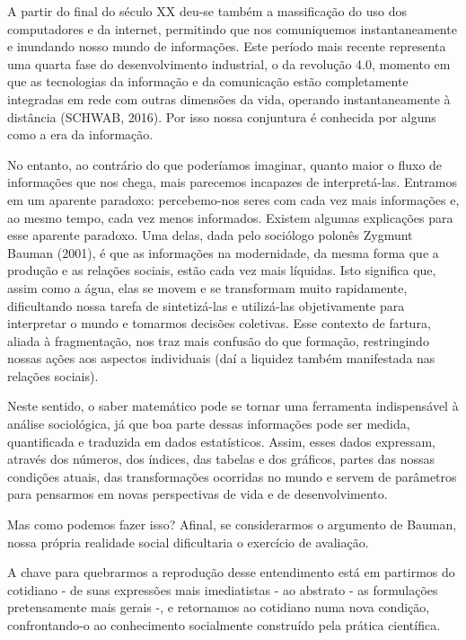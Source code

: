 A partir do final do século XX deu-se também a massificação do uso dos computadores e da internet, permitindo que nos comuniquemos instantaneamente e inundando nosso mundo de informações. Este período mais recente representa uma quarta fase do desenvolvimento industrial, o da revolução 4.0, momento em que as tecnologias da informação e da comunicação estão completamente integradas em rede com outras dimensões da vida, operando instantaneamente à distância (SCHWAB, 2016). Por isso nossa conjuntura é conhecida por alguns como a era da informação.

No entanto, ao contrário do que poderíamos imaginar, quanto maior o fluxo de informações que nos chega, mais parecemos incapazes de interpretá-las. Entramos em um aparente paradoxo: percebemo-nos seres com cada vez mais informações e, ao mesmo tempo, cada vez menos informados. Existem algumas explicações para esse aparente paradoxo. Uma delas, dada pelo sociólogo polonês Zygmunt Bauman (2001), é que as informações na modernidade, da mesma forma que a produção e as relações sociais, estão cada vez mais líquidas. Isto significa que, assim como a água, elas se movem e se transformam muito rapidamente, dificultando nossa tarefa de sintetizá-las e utilizá-las objetivamente para interpretar o mundo e tomarmos decisões coletivas. Esse contexto de fartura, aliada à fragmentação, nos traz mais confusão do que formação, restringindo nossas ações aos aspectos individuais (daí a liquidez também manifestada nas relações sociais).

Neste sentido, o saber matemático pode se tornar uma ferramenta indispensável à análise sociológica, já que boa parte dessas informações pode ser medida, quantificada e traduzida em dados estatísticos. Assim, esses dados expressam, através dos números, dos índices, das tabelas e dos gráficos, partes das nossas condições atuais, das transformações ocorridas no mundo e servem de parâmetros para pensarmos em novas perspectivas de vida e de desenvolvimento.

Mas como podemos fazer isso? Afinal, se considerarmos o argumento de Bauman, nossa própria realidade social dificultaria o exercício de avaliação.

A chave para quebrarmos a reprodução desse entendimento está em partirmos do cotidiano - de suas expressões mais imediatistas - ao abstrato - as formulações pretensamente mais gerais -, e retornamos ao cotidiano numa nova condição, confrontando-o ao conhecimento socialmente construído pela prática científica.

